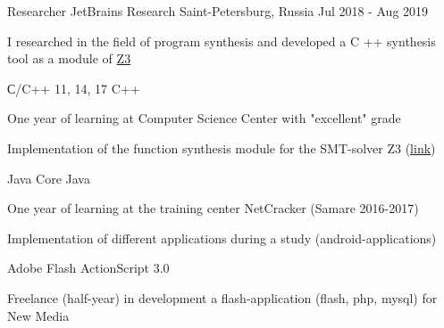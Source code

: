 \documentclass[11pt, a4paper]{awesome-cv}
\begin{document}
\begin{cventries}

  \cventry
    {Researcher} %
    {JetBrains Research} %
    {Saint-Petersburg, Russia} %
    {Jul 2018 - Aug 2019} %
    {
      \begin{cvitems} %
        \item {I researched in the field of program synthesis and developed a C ++ synthesis tool as a module of \href{https://github.com/Z3Prover/z3}{Z3}}
      \end{cvitems}
    }


\end{cventries}



\begin{cventries}

  \cventry
    {С/C++ 11, 14, 17} %
    {C++} %
    {} %
    {} %
    {
      \begin{cvitems} %
        \item {One year of learning at Computer Science Center with "excellent" grade}
        \item {Implementation  of the function synthesis module for the SMT-solver Z3 (\href{https://bitbucket.org/vad-mishenev/misynth/src/master/}{link})}
      \end{cvitems}
    }

  \cventry
    {Java Core} %
    {Java} %
    {} %
    {} %
    {
      \begin{cvitems} %
        \item {One year of learning at the training center NetCracker (Samare 2016-2017) }
        \item {Implementation of different  applications during a study (android-applications)}
      \end{cvitems}
    }
  \cventry
    {Adobe Flash} %
    {ActionScript 3.0} %
    {} %
    {} %
    {
      \begin{cvitems} %
        \item {Freelance (half-year) in development a flash-application (flash, php, mysql) for New Media}
      \end{cvitems}
    }
\end{cventries}
\end{document}

